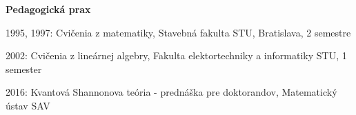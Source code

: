 \documentclass[12pt]{article}
\begin{document}
\begin{description}[noitemsep,leftmargin=1.3cm, font=\normalfont]
%
%
%
%
%

 




\end{description}

\noindent
\textbf{Pedagogická prax}
\begin{description}[noitemsep,leftmargin=1.3cm, font=\normalfont]
\item{1995, 1997:} Cvičenia z matematiky, Stavebná fakulta STU, Bratislava, 2 semestre
\item{2002:} Cvičenia z lineárnej algebry, Fakulta elektortechniky a informatiky STU, 1 semester
\item{2016:} Kvantová Shannonova teória - prednáška pre doktorandov, Matematický ústav SAV
\end{description}
\end{document}
